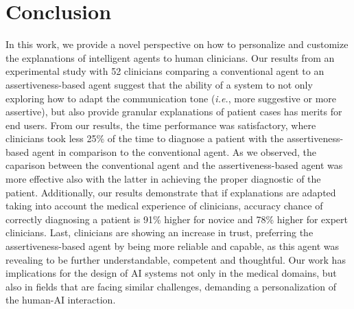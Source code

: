 \section{Conclusion}
\label{sec:chap006008}

In this work, we provide a novel perspective on how to personalize and customize the explanations of intelligent agents to human clinicians.
Our results from an experimental study with 52 clinicians comparing a conventional agent to an assertiveness-based agent suggest that the ability of a system to not only exploring how to adapt the communication tone ({\it i.e.}, more suggestive or more assertive), but also provide granular explanations of patient cases has merits for end users.
From our results, the time performance was satisfactory, where clinicians took less 25\% of the time to diagnose a patient with the assertiveness-based agent in comparison to the conventional agent.
As we observed, the caparison between the conventional agent and the assertiveness-based agent was more effective also with the latter in achieving the proper diagnostic of the patient.
Additionally, our results demonstrate that if explanations are adapted taking into account the medical experience of clinicians, accuracy chance of correctly diagnosing a patient is 91\% higher for novice and 78\% higher for expert clinicians.
Last, clinicians are showing an increase in trust, preferring the assertiveness-based agent by being more reliable and capable, as this agent was revealing to be further understandable, competent and thoughtful.
Our work has implications for the design of \ac{AI} systems not only in the medical domains, but also in fields that are facing similar challenges, demanding a personalization of the human-AI interaction.